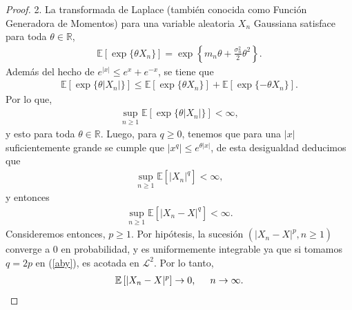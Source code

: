 \begin{proof}
2. La transformada de Laplace (también conocida como Función Generadora de Momentos) para una variable aleatoria $X_n$ Gaussiana satisface para toda $\theta \in \mathbb{R}$,
	\begin{align*}
	\mathbb{E} \left[ \exp \{\theta X_n\} \right] = \exp \left\{ m_n \theta +  \frac{\sigma_n^2}{2} \theta^2 \right\}. 
	\end{align*}
Además del hecho de $e^{|x|} \leq e^x + e^{-x}$, se tiene que
	\begin{align*}
	\mathbb{E} \left[ \exp \{ \theta |X_n|\} \right] \leq \mathbb{E}[\exp \{ \theta X_n\}] + \mathbb{E}[\exp \{ - \theta X_n\}].
	\end{align*}
Por lo que, 
	\begin{align*}
	\sup_{n \geq 1} \mathbb{E} \left[ \exp \{ \theta |X_n|\} \right] < \infty,
	\end{align*}
y esto para toda $\theta \in \mathbb{R}$. Luego, para $q \geq 0$, tenemos que para una $|x|$ suficientemente grande se cumple que $|x^q| \leq e^{\theta |x|}$, de esta desigualdad deducimos que
	\begin{align*}
	\sup_{n \geq 1} \mathbb{E} \left[ |X_n|^q \right] < \infty,
	\end{align*}
y entonces
	\begin{align}
	\sup_{n \geq 1} \mathbb{E} \left[ |X_n - X|^q \right] < \infty. \label{aby}
	\end{align}
Consideremos entonces, $p \geq 1$. Por hipótesis, la sucesión $(|X_n - X|^p, n \geq 1)$ converge a 0 en probabilidad, y es uniformemente integrable ya que si tomamos $q = 2p$ en (\ref{aby}), es acotada en $\mathcal{L}^2$. Por lo tanto, 
	\begin{align*}
	\mathbb{E} \left[ |X_n - X|^p \right] \rightarrow 0, \hspace{0.5cm} n \rightarrow \infty.
	\end{align*}
\end{proof}

